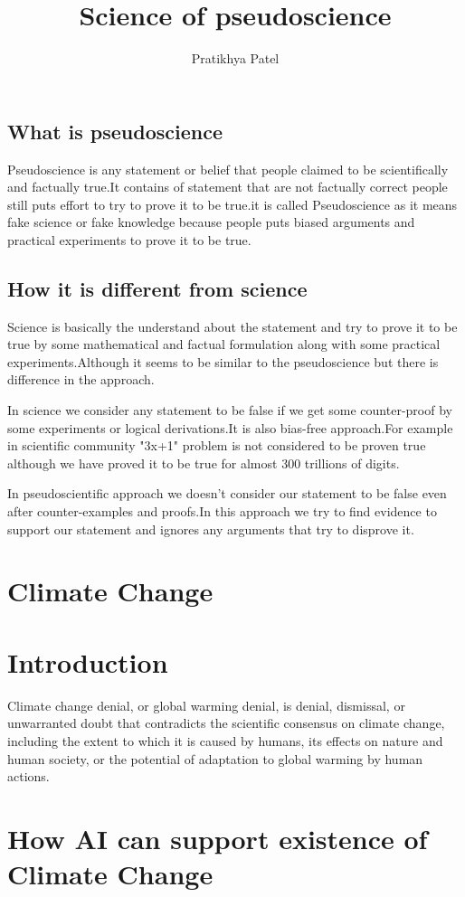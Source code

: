 \documentclass[12pt]{article}
\title{Science of pseudoscience}
\author{Pratikhya Patel}
\begin{document}
\maketitle
\subsection*{What is pseudoscience}
Pseudoscience is any statement or belief that people claimed to be scientifically and factually true.It contains of statement that are not factually correct people still puts effort to try to prove it to be true.it is called Pseudoscience as it means fake science or fake knowledge because people puts biased arguments and practical experiments to prove it to be true.
\subsection*{How it is different from science}
Science is basically the understand about the statement and try to prove it to be true by some mathematical and factual formulation along with some practical experiments.Although it seems to be similar to the pseudoscience but there is difference in the approach.
\par
In science we consider any statement to be false if we get some counter-proof by some experiments or logical derivations.It is also bias-free approach.For example in scientific community "3x+1" problem is not considered to be proven true although we have proved it to be true for almost 300 trillions of digits.
\par
In pseudoscientific approach we doesn't consider our statement to be false even after counter-examples and proofs.In this approach we try to find evidence to support our statement and ignores any arguments that try to disprove it.
\section*{Climate Change}
\section*{Introduction}
Climate change denial, or global warming denial, is denial, dismissal, or unwarranted doubt that contradicts the scientific consensus on climate change, including the extent to which it is caused by humans, its effects on nature and human society, or the potential of adaptation to global warming by human actions.

\section*{How AI can support existence of Climate Change}
\end{document}
